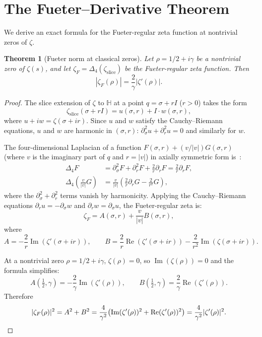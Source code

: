 \documentclass[11pt,a4paper]{article}
\newtheorem{theorem}{Theorem}[section]
\theoremstyle{definition}
\DeclareMathOperator{\re}{Re}
\DeclareMathOperator{\im}{Im}
\begin{document}
\section{The Fueter--Derivative Theorem}
\label{sec:fueter}

We derive an exact formula for the Fueter-regular zeta function at nontrivial zeros of $\zeta$.

\begin{theorem}[Fueter norm at classical zeros]\label{thm:fueter}
Let $\rho = 1/2 + i\gamma$ be a nontrivial zero of $\zeta(s)$, and let $\zeta_F = \Delta_4(\zeta_{\mathrm{slice}})$ be the Fueter-regular zeta function. Then
\[
|\zeta_F(\rho)| = \frac{2}{\gamma} |\zeta'(\rho)|.
\]
\end{theorem}

\begin{proof}
The slice extension of $\zeta$ to $\mathbb{H}$ at a point $q = \sigma + rI$ ($r > 0$) takes the form
\[
\zeta_{\mathrm{slice}}(\sigma + rI) = u(\sigma, r) + I \cdot w(\sigma, r),
\]
where $u + iw = \zeta(\sigma + ir)$. Since $u$ and $w$ satisfy the Cauchy--Riemann equations, $u$ and $w$ are harmonic in $(\sigma, r)$: $\partial_\sigma^2 u + \partial_r^2 u = 0$ and similarly for $w$.

The four-dimensional Laplacian of a function $F(\sigma, r) + (v/|v|) G(\sigma, r)$ (where $v$ is the imaginary part of $q$ and $r = |v|$) in axially symmetric form is~\cite{GentiliStoppato2023}:
\begin{align*}
\Delta_4 F &= \partial_\sigma^2 F + \partial_r^2 F + \frac{2}{r} \partial_r F = \frac{2}{r} \partial_r F, \\
\Delta_4 \left(\frac{v}{|v|} G\right) &= \frac{v}{|v|} \left(\frac{2}{r} \partial_r G - \frac{2}{r^2} G\right),
\end{align*}
where the $\partial_\sigma^2 + \partial_r^2$ terms vanish by harmonicity. Applying the Cauchy--Riemann equations $\partial_r u = -\partial_\sigma w$ and $\partial_r w = \partial_\sigma u$, the Fueter-regular zeta is:
\begin{equation}\label{eq:fueter-components}
\zeta_F = A(\sigma, r) + \frac{v}{|v|} B(\sigma, r),
\end{equation}
where
\[
A = -\frac{2}{r} \im(\zeta'(\sigma + ir)), \qquad
B = \frac{2}{r} \re(\zeta'(\sigma + ir)) - \frac{2}{r^2} \im(\zeta(\sigma + ir)).
\]

At a nontrivial zero $\rho = 1/2 + i\gamma$, $\zeta(\rho) = 0$, so $\im(\zeta(\rho)) = 0$ and the formula simplifies:
\[
A(\tfrac{1}{2}, \gamma) = -\frac{2}{\gamma} \im(\zeta'(\rho)), \qquad
B(\tfrac{1}{2}, \gamma) = \frac{2}{\gamma} \re(\zeta'(\rho)).
\]
Therefore
\[
|\zeta_F(\rho)|^2 = A^2 + B^2 = \frac{4}{\gamma^2}\bigl(\im(\zeta'(\rho))^2 + \re(\zeta'(\rho))^2\bigr) = \frac{4}{\gamma^2} |\zeta'(\rho)|^2. \qedhere
\]
\end{proof}
\end{document}
